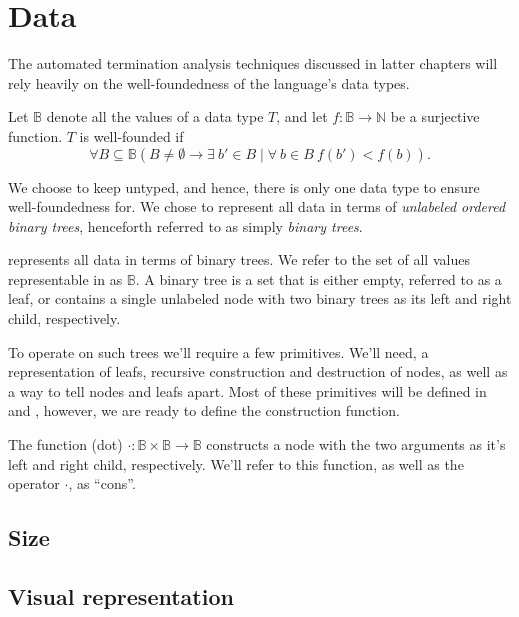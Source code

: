 \section{Data}

The automated termination analysis techniques discussed in latter chapters will
rely heavily on the well-foundedness of the language's data types.

\begin{definition} Let $\mathbb{B}$ denote all the values of a data type $T$,
and let $f:\mathbb{B}\rightarrow \mathbb{N}$ be a surjective function. $T$ is
well-founded if $$\forall B\subseteq \mathbb{B} \left( B \neq \emptyset
\rightarrow \exists\ b' \in B \mid \forall\ b\in B\ f(b') <
f(b)\right).$$\end{definition}

We choose to keep \D{} untyped, and hence, there is only one data type to
ensure well-foundedness for. We chose to represent all data in terms of
\emph{unlabeled ordered binary trees}, henceforth referred to as simply
\emph{binary trees}.

\begin{definition} \D{} represents all data in terms of binary trees. We refer
to the set of all values representable in \D{} as $\mathbb{B}$. A binary tree
is a set that is either empty, referred to as a leaf, or contains a single
unlabeled node with two binary trees as its left and right child,
respectively.\end{definition}

To operate on such trees we'll require a few primitives. We'll need, a
representation of leafs, recursive construction and destruction of nodes, as
well as a way to tell nodes and leafs apart. Most of these primitives will be
defined in  and , however, we
are ready to define the construction function.

\begin{definition} The function (dot) $\cdot
:\mathbb{B}\times\mathbb{B}\rightarrow\mathbb{B}$ constructs a node with the
two arguments as it's left and right child, respectively. We'll refer to this
function, as well as the operator $\cdot$, as ``cons''.\end{definition}

\subsection{Size}

\subsection{Visual representation}

